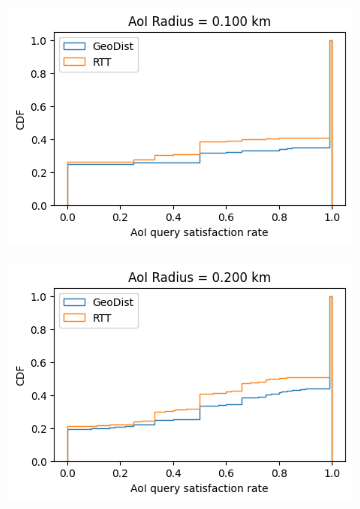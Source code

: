 \begin{figure}
\centering
\begin{subfigure}{0.333\textwidth}
  \centering
  \includegraphics[width=\linewidth]{figures/mechanisms/spatial_ctx_mgmt/aoi_satisfaction_rate_cdf_AOI_0.100_km.png}
  \caption{}
\end{subfigure}%
\begin{subfigure}{0.333\textwidth}
  \centering
  \includegraphics[width=\linewidth]{figures/mechanisms/spatial_ctx_mgmt/aoi_satisfaction_rate_cdf_AOI_0.200_km.png}
  \caption{}
\end{subfigure}
\begin{subfigure}{0.333\textwidth}
  \centering

\end{subfigure}
\end{figure}
